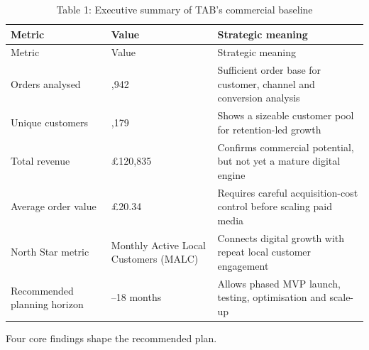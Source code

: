 \documentclass[
  11pt,
]{article}
\begin{document}
\begin{longtable}[]{@{}
  >{\raggedright\arraybackslash}p{}
  >{\raggedright\arraybackslash}p{}
  >{\raggedright\arraybackslash}p{}@{}}
\caption{Table 1: Executive summary of TAB's commercial
baseline}\tabularnewline
\toprule\noalign{}
\begin{minipage}[b]{\linewidth}\raggedright
Metric
\end{minipage} & \begin{minipage}[b]{\linewidth}\raggedright
Value
\end{minipage} & \begin{minipage}[b]{\linewidth}\raggedright
Strategic meaning
\end{minipage} \\
\midrule\noalign{}
\endfirsthead
\toprule\noalign{}
\begin{minipage}[b]{\linewidth}\raggedright
Metric
\end{minipage} & \begin{minipage}[b]{\linewidth}\raggedright
Value
\end{minipage} & \begin{minipage}[b]{\linewidth}\raggedright
Strategic meaning
\end{minipage} \\
\midrule\noalign{}
\endhead
\bottomrule\noalign{}
\endlastfoot
Orders analysed & 5,942 & Sufficient order base for customer, channel
and conversion analysis \\
Unique customers & 4,179 & Shows a sizeable customer pool for
retention-led growth \\
Total revenue & £120,835 & Confirms commercial potential, but not yet a
mature digital engine \\
Average order value & £20.34 & Requires careful acquisition-cost control
before scaling paid media \\
North Star metric & Monthly Active Local Customers (MALC) & Connects
digital growth with repeat local customer engagement \\
Recommended planning horizon & 12--18 months & Allows phased MVP launch,
testing, optimisation and scale-up \\
\end{longtable}

Four core findings shape the recommended plan.
\end{document}
